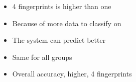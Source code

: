 
\begin{itemize}
\item 4 fingerprints is higher than one
\item Because of more data to classify on
\item The system can predict better
\item Same for all groups
\item Overall accuracy, higher, 4 fingerprints
\end{itemize}
